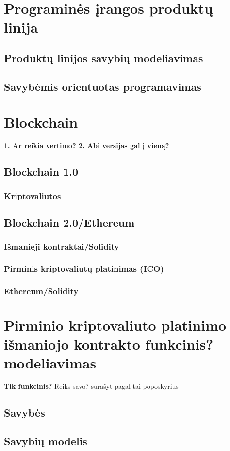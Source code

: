 \documentclass{VUMIFInfKursinis}
\begin{document}
\section{Programinės įrangos produktų linija}
\subsection{Produktų linijos savybių modeliavimas}
\subsection{Savybėmis orientuotas programavimas}
\section{Blockchain}
\textbf{1. Ar reikia vertimo? 2. Abi versijas gal į vieną?}
\subsection{Blockchain 1.0}
\subsubsection{Kriptovaliutos}
\subsection{Blockchain 2.0/Ethereum}
\subsubsection{Išmanieji kontraktai/Solidity}
\subsubsection{Pirminis kriptovaliutų platinimas (ICO)}
\subsubsection{Ethereum/Solidity}
\section{Pirminio kriptovaliuto platinimo išmaniojo kontrakto funkcinis? modeliavimas}
\textbf{Tik funkcinis?}
Reiks savo? surašyt pagal tai poposkyrius
\subsection{Savybės}
\subsection{Savybių modelis}
\end{document}
